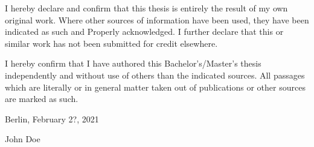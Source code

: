
I hereby declare and confirm that this thesis is entirely the result of my own original work. Where other sources of information have been used, they have been indicated as such and Properly acknowledged. I further declare that this or similar work has not been submitted for credit elsewhere.

I hereby confirm that I have authored this Bachelor’s/Master’s thesis independently and without use of others than the indicated sources. All passages which are literally or in general matter taken out of publications or other sources are marked as such.

\vskip 1cm

Berlin, February 2?, 2021

\vskip 1.5cm

John Doe
